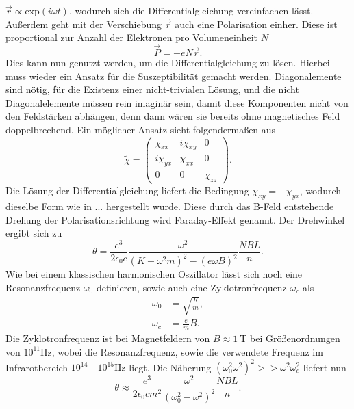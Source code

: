 $\vec{r} \propto \text{exp}(i\omega t)$, wodurch sich die Differentialgleichung vereinfachen lässt.
Außerdem geht mit der Verschiebung $\vec{r}$ auch eine Polarisation einher. Diese ist proportional zur Anzahl der Elektronen pro Volumeneinheit $N$
\begin{equation*}
\vec{P} = - e N\vec{r}.
\end{equation*}
Dies kann nun genutzt werden, um die Differentialgleichung zu lösen. Hierbei muss wieder ein Ansatz für die Suszeptibilität gemacht werden. Diagonalemente sind nötig, für die Existenz
einer nicht-trivialen Lösung, und die nicht Diagonalelemente müssen rein imaginär sein, damit diese Komponenten nicht von den Feldstärken abhängen, denn dann wären sie bereits ohne 
magnetisches Feld doppelbrechend.
Ein möglicher Ansatz sieht folgendermaßen aus 
\begin{equation*}
    \tilde{\chi} = \begin{pmatrix}
        \chi_{xx} & i\chi_{xy} & 0 \\
        i\chi_{yx} & \chi_{xx} & 0 \\
        0 & 0 & \chi_{zz}
        \end{pmatrix}.
\end{equation*}
Die Lösung der Differentialgleichung liefert die Bedingung $\chi_{xy} = -\chi_{yx}$, wodurch dieselbe Form wie in ... hergestellt wurde.
Diese durch das B-Feld entstehende Drehung der Polarisationsrichtung wird Faraday-Effekt genannt.
Der Drehwinkel ergibt sich zu
\begin{equation}
\theta = \frac{e^3}{2 \epsilon_0 c} \frac{\omega^2}{(K - \omega^2 m)^2 - (e\omega B)^2} \frac{NBL}{n}.
\end{equation}
Wie bei einem klassischen harmonischen Oszillator lässt sich noch eine Resonanzfrequenz $\omega_0$ definieren, sowie auch eine Zyklotronfrequenz $\omega_c$ als
\begin{align*}
\omega_0 &= \sqrt{\frac{K}{m}}, \\
\omega_c &= \frac{e}{m}B.
\end{align*}
Die Zyklotronfrequenz ist bei Magnetfeldern von $B \approx \SI{1}{\tesla}$ bei Größenordnungen von $10^{11}\si{\hertz}$, wobei die Resonanzfrequenz, sowie die verwendete Frequenz im
Infrarotbereich $10^{14}$ - $10^{15}\si{\hertz}$ liegt. Die Näherung $(\omega^2_0 \omega^2)^2 >> \omega^2\omega^2_c$ liefert nun
\begin{equation*}
    \theta \approx \frac{e^3}{2 \epsilon_0 c m^2} \frac{\omega^2}{(\omega^2_0 -\omega^2)^2} \frac{NBL}{n}.
\end{equation*}
